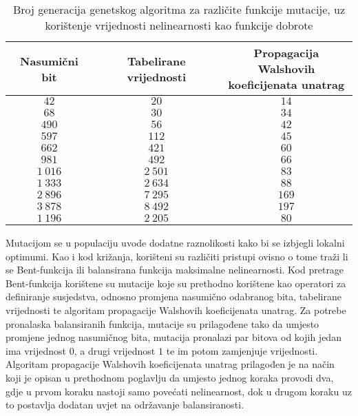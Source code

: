 \begin{table}[]
    \centering
    \captionsetup{justification=centering}
    \caption{Broj generacija genetskog algoritma za različite funkcije mutacije, uz korištenje vrijednosti nelinearnosti kao funkcije dobrote}
    \begin{tabular}{ccc} \hline
        Nasumični bit & Tabelirane vrijednosti & \makecell{Propagacija Walshovih \\ koeficijenata unatrag} \\ \hline
            $42$ &     $20$ &  $14$ \\
            $68$ &     $30$ &  $34$ \\
           $490$ &     $56$ &  $42$ \\
           $597$ &    $112$ &  $45$ \\
           $662$ &    $421$ &  $60$ \\
           $981$ &    $492$ &  $66$ \\
        $1\:016$ & $2\:501$ &  $83$ \\
        $1\:333$ & $2\:634$ &  $88$ \\
        $2\:896$ & $7\:295$ & $169$ \\
        $3\:878$ & $8\:492$ & $197$ \\ \hline
        $1\:196$ & $2\:205$ &  $80$
    \end{tabular}
    \label{tbl:ga_6_nonl}
\end{table}

Mutacijom se u populaciju uvode dodatne raznolikosti kako bi se izbjegli lokalni optimumi.
Kao i kod križanja, korišteni su različiti pristupi ovisno o tome traži li se Bent-funkcija ili balansirana funkcija maksimalne nelinearnosti.
Kod pretrage Bent-funkcija korištene su mutacije koje su prethodno korištene kao operatori za definiranje susjedstva, odnosno promjena nasumično odabranog bita, tabelirane vrijednosti te algoritam propagacije Walshovih koeficijenata unatrag.
Za potrebe pronalaska balansiranih funkcija, mutacije su prilagođene tako da umjesto promjene jednog nasumičnog bita, mutacija pronalazi par bitova od kojih jedan ima vrijednost $0$, a drugi vrijednost $1$ te im potom zamjenjuje vrijednosti.
Algoritam propagacije Walshovih koeficijenata unatrag prilagođen je na način koji je opisan u prethodnom poglavlju da umjesto jednog koraka provodi dva, gdje u prvom koraku nastoji samo povećati nelinearnost, dok u drugom koraku uz to postavlja dodatan uvjet na održavanje balansiranosti.

